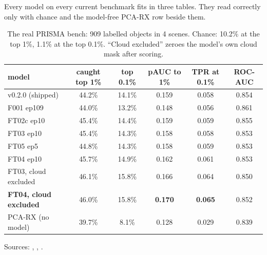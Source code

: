 Every model on every current benchmark fits in three tables. They read correctly only with chance and the model-free
PCA-RX row beside them.

\begin{table}[htbp]
\centering
\caption{The real PRISMA bench: 909 labelled objects in 4 scenes. Chance: 10.2\% at the top 1\%, 1.1\% at the top
0.1\%. ``Cloud excluded'' zeroes the model's own cloud mask after scoring.}
\label{tab:ftruns:real}
\small\setlength{\tabcolsep}{4pt}
\begin{tabular}{lccccc}
\toprule
model & caught top 1\% & top 0.1\% & pAUC to 1\% & TPR at 0.1\% & ROC-AUC \\
\midrule
v0.2.0 (shipped) & 44.2\% & 14.1\% & 0.159 & 0.058 & 0.854 \\
F001 ep109 & 44.0\% & 13.2\% & 0.148 & 0.056 & 0.861 \\
FT02c ep10 & 45.4\% & 14.4\% & 0.159 & 0.059 & 0.855 \\
FT03 ep10 & 45.4\% & 14.3\% & 0.158 & 0.058 & 0.853 \\
FT05 ep5 & 44.8\% & 14.3\% & 0.158 & 0.059 & 0.853 \\
FT04 ep10 & 45.7\% & 14.9\% & 0.162 & 0.061 & 0.853 \\
FT03, cloud excluded & 46.1\% & 15.8\% & 0.166 & 0.064 & 0.850 \\
\textbf{FT04, cloud excluded} & 46.0\% & 15.8\% & \textbf{0.170} & \textbf{0.065} & 0.852 \\
PCA-RX (no model) & 39.7\% & 8.1\% & 0.128 & 0.029 & 0.839 \\
\bottomrule
\end{tabular}

\smallskip
{\footnotesize Sources: , ,
.}
\end{table}

